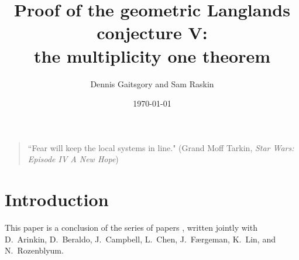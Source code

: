\documentclass[9pt]{amsart}
\theoremstyle{remark}
\theoremstyle{definition}
\theoremstyle{remark}
\numberwithin{equation}{section}
\begin{document}
%

\vskip1cm




\title[Proof of the geometric Langlands conjecture V]{Proof of the geometric Langlands conjecture V: \\ the multiplicity one theorem}

\author{Dennis Gaitsgory and Sam Raskin}

\begin{quote}
``Fear will keep the local systems in line." \newline (Grand Moff Tarkin, \emph{Star Wars: Episode IV \textendash{} A New Hope}) \vskip0.5cm
\end{quote}



\date{\today}



\maketitle

\bigskip

\bigskip



\tableofcontents

\section*{Introduction}

This paper is a %
conclusion of the series of papers \cite{GLC1,GLC2,GLC3,GLC4}, written jointly with D.~Arinkin, D.~Beraldo, J.~Campbell, 
L.~Chen, J.~F\ae{}rgeman, K.~Lin, and N.~Rozenblyum.
\end{document}
